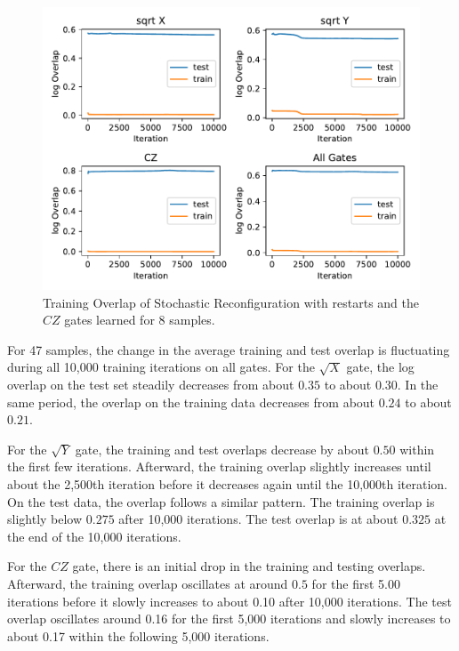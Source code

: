 \begin{figure}[H]
  \centering
  \includegraphics[width=\textwidth]{figures/results/SR-restarts-learned/avgOverlap_8.pdf}
  \caption[Training and Testing Overlaps for Stochastic Reconfiguration with Random Restarts and $CZ$ Gates Learned - 8 Samples]{Training 
  Overlap of Stochastic Reconfiguration with restarts and the $CZ$ gates learned for 8 samples.}
  \label{fig:sr_restarts_overlap_8}
\end{figure}

For 47 samples, the change in the average training and test overlap is fluctuating during all 10,000
training iterations on all gates. For the 
$\sqrt{X}$ gate, the log overlap on the test set steadily decreases from 
about $0.35$ to about $0.30$. In the same period, the overlap on the training data decreases from about $0.24$ to about $0.21$.

For the $\sqrt{Y}$ gate, the training and test overlaps decrease by about $0.50$ within the first few iterations. 
Afterward, the training overlap slightly increases until about the 2,500th iteration before it decreases again 
until the 10,000th iteration. On the test data, the overlap follows a similar pattern. The 
training overlap is slightly below $0.275$ after 10,000 iterations. The test overlap is at about $0.325$ 
at the end of the 10,000 iterations. 

For the $CZ$ gate, there is an initial drop in the training and testing overlaps. Afterward, 
the training overlap oscillates at around $0.5$ for the first 5.00 iterations before it slowly increases to about 
0.10 after 10,000 iterations. The test overlap oscillates around 0.16 for the first 5,000 iterations and 
slowly increases to about 0.17 within the following 5,000 iterations. 

